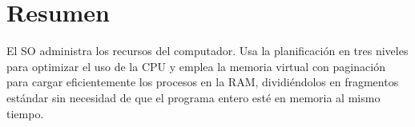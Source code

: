 \documentclass{article}
\begin{document}
\section{Resumen}
\label{sec:orgb4f4bbf}
El SO administra los recursos del computador. Usa la planificación en
tres niveles para optimizar el uso de la CPU y emplea la memoria
virtual con paginación para cargar eficientemente los procesos en la
RAM, dividiéndolos en fragmentos estándar sin necesidad de que el
programa entero esté en memoria al mismo tiempo.
\end{document}
